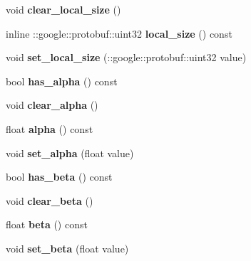 \begin{DoxyCompactItemize}
void {\bfseries clear\+\_\+local\+\_\+size} ()
\item 
\mbox{\label{classcaffe_1_1_v0_layer_parameter_aabc1f1c8839bbafdb4a47b9c8f955dc3}} 
inline \+::google\+::protobuf\+::uint32 {\bfseries local\+\_\+size} () const
\item 
\mbox{\label{classcaffe_1_1_v0_layer_parameter_a34e77253ee8b339313a56aec3e27e942}} 
void {\bfseries set\+\_\+local\+\_\+size} (\+::google\+::protobuf\+::uint32 value)
\item 
\mbox{\label{classcaffe_1_1_v0_layer_parameter_a3cc3f7dc7c51092cec85db1ad91c78fa}} 
bool {\bfseries has\+\_\+alpha} () const
\item 
\mbox{\label{classcaffe_1_1_v0_layer_parameter_a71b72195d57d89637bdfffd9c0010005}} 
void {\bfseries clear\+\_\+alpha} ()
\item 
\mbox{\label{classcaffe_1_1_v0_layer_parameter_ad1482942af8f1ed3b6e38d3837a57cfb}} 
float {\bfseries alpha} () const
\item 
\mbox{\label{classcaffe_1_1_v0_layer_parameter_a2d48fc16d94f4d47f469d91d3e335621}} 
void {\bfseries set\+\_\+alpha} (float value)
\item 
\mbox{\label{classcaffe_1_1_v0_layer_parameter_a7efb1ab991b0f7b6efc8a81e66734352}} 
bool {\bfseries has\+\_\+beta} () const
\item 
\mbox{\label{classcaffe_1_1_v0_layer_parameter_afd150a0acc8d019ddf1444c6ce27b8ed}} 
void {\bfseries clear\+\_\+beta} ()
\item 
\mbox{\label{classcaffe_1_1_v0_layer_parameter_aab23fd2c3f0a6b1a0e27c8d6de7815d9}} 
float {\bfseries beta} () const
\item 
\mbox{\label{classcaffe_1_1_v0_layer_parameter_a97bf76fcda188b5716c44131e8904266}} 
void {\bfseries set\+\_\+beta} (float value)

\end{DoxyCompactItemize}
